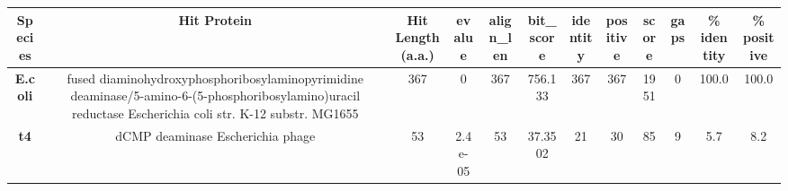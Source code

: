 \begin{tabular}{|c|c|c|c|c|c|c|c|c|c|c|c|} \hline
\textbf{Species} & \textbf{Hit Protein} & \textbf{Hit Length (a.a.)} & \textbf{evalue} & \textbf{align\_len} & \textbf{bit\_score} & \textbf{identity} & \textbf{positive} & \textbf{score} & \textbf{gaps} & \textbf{\% identity} & \textbf{\% positive} \\ \hline
\textbf{E.coli} & fused diaminohydroxyphosphoribosylaminopyrimidine deaminase/5-amino-6-(5-phosphoribosylamino)uracil reductase Escherichia coli str. K-12 substr. MG1655 & 367 & 0 & 367 & 756.133 & 367 & 367 & 1951 & 0 & 100.0 & 100.0\\
\textbf{t4} & dCMP deaminase Escherichia phage  & 53 & 2.4e-05 & 53 & 37.3502 & 21 & 30 & 85 & 9 & 5.7 & 8.2\\
\hline \end{tabular}
